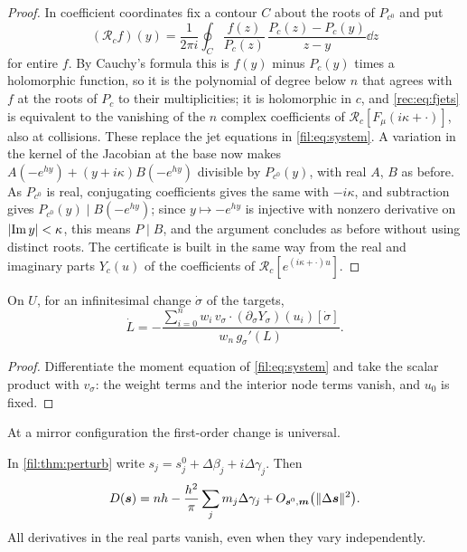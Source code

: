 \begin{proof}
In coefficient coordinates fix a contour $C$ about the roots of $P_{c^0}$ and put
\[
 (\mathcal R_cf)(y)=\frac1{2\pi i}\oint_C\frac{f(z)}{P_c(z)}\,\frac{P_c(z)-P_c(y)}{z-y}\dd z
\]
for entire $f$. By Cauchy's formula this is $f(y)$ minus $P_c(y)$ times a holomorphic function, so it is the
polynomial of degree below $n$ that agrees with $f$ at the roots of $P_c$ to their multiplicities; it is
holomorphic in $c$, and \eqref{rec:eq:fjets} is equivalent to the vanishing of the $n$ complex coefficients of
$\mathcal R_c[F_\mu(i\kappa+\cdot)]$, also at collisions. These replace the jet equations in
\eqref{fil:eq:system}. A variation in the kernel of the Jacobian at the base now makes
$A(-e^{hy})+(y+i\kappa)B(-e^{hy})$ divisible by $P_{c^0}(y)$, with real $A$, $B$ as before. As $P_{c^0}$ is real,
conjugating coefficients gives the same with $-i\kappa$, and subtraction gives $P_{c^0}(y)\mid B(-e^{hy})$; since
$y\mapsto-e^{hy}$ is injective with nonzero derivative on $\lvert\operatorname{Im} y\rvert<\kappa$, this means $P\mid B$, and the
argument concludes as before without using distinct roots. The certificate is built in the same way from
the real and imaginary parts $Y_c(u)$ of the coefficients of $\mathcal R_c[e^{(i\kappa+\cdot)u}]$.
\end{proof}

\begin{proposition}\label{fil:prop:sense}
On $U$, for an infinitesimal change $\dot\sigma$ of the targets,
\[
 \dot L=-\frac{\sum_{i=0}^nw_i\,v_\sigma\cdot(\partial_\sigma Y_\sigma)(u_i)[\dot\sigma]}{w_n\,g_\sigma'(L)} .
\]
\end{proposition}

\begin{proof}
Differentiate the moment equation of \eqref{fil:eq:system} and take the scalar product with $v_\sigma$:
the weight terms and the interior node terms vanish, and $u_0$ is fixed.
\end{proof}

At a mirror configuration the first-order change is universal.

\begin{theorem}\label{fil:thm:differential}
In \cref{fil:thm:perturb} write $s_j=s_j^0+\Delta\beta_j+i\Delta\gamma_j$. Then
\[
 D(\boldsymbol s)=nh-\frac{h^2}\pi\sum_jm_j\Delta\gamma_j+O_{\boldsymbol s^0,\boldsymbol m}\bigl(\lVert\Delta\boldsymbol s\rVert^2\bigr).
\]
All derivatives in the real parts vanish, even when they vary independently.
\end{theorem}

